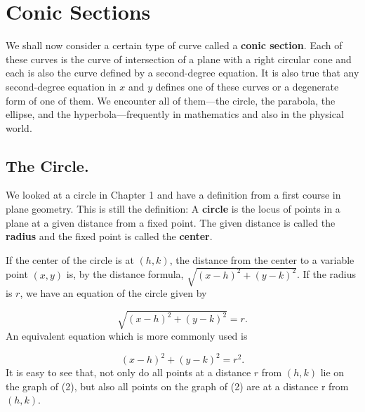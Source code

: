 \chapter{Conic Sections} \label{chp 3}

We shall now consider a certain type of curve called a \textbf{conic section}. Each of these curves is the curve of intersection of a plane with a right circular cone and each is also the curve defined by a second-degree equation. It is also true that any second-degree equation in $x$ and $y$ defines one of these curves or a degenerate form of one of them. We encounter all of them---the circle, the parabola, the ellipse, and the hyperbola---frequently in mathematics and also in the physical world.

\section{The Circle.}\label{sec 3.1} 
 We looked at a circle in Chapter 1 and have a definition from a first course in
plane geometry. This is still the definition: A \textbf{circle} is the locus of points in a plane at a given distance from a fixed point. The given distance is called the \textbf{radius} and the fixed point is called the \textbf{center}.

If the center of the circle is at $(h, k)$, the distance from the center to a variable point $(x,y)$ is, by the distance formula, $\sqrt{(x-h)^2 + (y-k)^2}$. If the radius is $r$, we have an equation of the circle given by

\begin{equation}
\sqrt{(x-h)^2 + (y-k)^2} = r.   
\label{eq3.1.1}
\end{equation}
\noindent An equivalent equation which is more commonly used is

\begin{equation}
(x-h)^2 + (y-k)^2 = r^2.  
\label{eq3.1.2}
\end{equation}
\noindent It is easy to see that, not only do all points at a distance $r$ from $(h, k)$ lie on the graph of (2), but also all points on the graph of (2) are at a distance r from $(h, k)$.
\medskip

